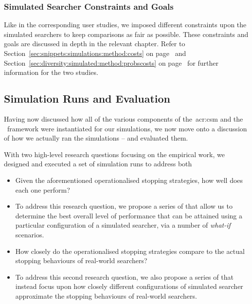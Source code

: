 \subsubsection{Simulated Searcher Constraints and Goals}\label{sec:method:simulation:grounding:constraints}
Like in the corresponding user studies, we imposed different constraints upon the simulated searchers to keep comparisons as fair as possible. These constraints and goals are discussed in depth in the relevant chapter. Refer to Section~\ref{sec:snippets:simulations:method:costs} on page~\pageref{sec:snippets:simulations:method:costs} and Section~\ref{sec:diversity:simulated:method:probscosts} on page~\pageref{sec:diversity:simulated:method:probscosts} for further information for the two studies.

\subsection{Simulation Runs and Evaluation}\label{sec:method:simulation:runs}
Having now discussed how all of the various components of the~\gls{acr:csm} and the \simiir~framework were instantiated for our simulations, we now move onto a discussion of how we actually ran the simulations -- and evaluated them.

With two high-level research questions focusing on the empirical work, we designed and executed a set of simulation runs to address both

\begin{itemize}
    \item{ Given the aforementioned operationalised stopping strategies, how well does each one perform?}
    \item[]{To address this research question, we propose a series of  that allow us to determine the best overall level of performance that can be attained using a particular configuration of a simulated searcher, via a number of \emph{what-if} scenarios.}
    
    \item{ How closely do the operationalised stopping strategies compare to the actual stopping behaviours of real-world searchers?}
    \item[]{To address this second research question, we also propose a series of  that instead focus upon how closely different configurations of simulated searcher approximate the stopping behaviours of real-world searchers.}
\end{itemize}

